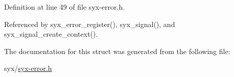 Definition at line 49 of file syx-error.h.

Referenced by syx\_\-error\_\-register(), syx\_\-signal(), and syx\_\-signal\_\-create\_\-context().

The documentation for this struct was generated from the following file:\begin{CompactItemize}
\item 
syx/\hyperlink{syx-error_8h}{syx-error.h}\end{CompactItemize}
